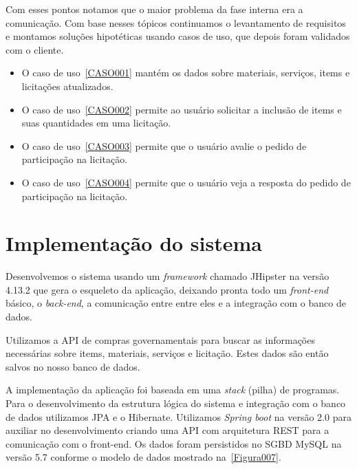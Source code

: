 Com esses pontos notamos que o maior problema da fase interna era a comunicação. 
Com base nesses tópicos continuamos o levantamento de requisitos e montamos soluções hipotéticas usando casos de uso, que depois foram validados com o cliente.

\begin{itemize}
    \item O caso de uso~\ref{CASO001} mantém os dados sobre  materiais, serviços, items e licitações atualizados.
    
    \item O caso de uso~\ref{CASO002} permite ao usuário solicitar a inclusão de items e suas quantidades em uma licitação.

    \item O caso de uso~\ref{CASO003} permite que o usuário avalie o pedido de participação na licitação.
    
    \item O caso de uso~\ref{CASO004} permite que o usuário veja a resposta do pedido de participação na licitação.

\end{itemize}


\section{Implementação do sistema}

Desenvolvemos o sistema usando um \textit{framework} chamado JHipster na versão 4.13.2 que gera o esqueleto da aplicação, deixando pronta todo um \textit{front-end} básico, o \textit{back-end}, a comunicação entre entre eles e a integração com o banco de dados.


Utilizamos a API de compras governamentais para buscar as informações necessárias sobre items, materiais, serviços e licitação.
Estes dados são então salvos no nosso banco de dados.

A implementação da aplicação foi baseada em uma \textit{stack} (pilha) de programas.
Para o desenvolvimento da estrutura lógica do sistema e integração com o banco de dados utilizamos JPA e o Hibernate.
Utilizamos \textit{Spring boot} na versão 2.0 para auxiliar no desenvolvimento criando uma API com arquitetura REST para a comunicação com o front-end.
Os dados foram persistidos no SGBD MySQL na versão 5.7 conforme o modelo de dados mostrado na~\ref{Figura007}.

